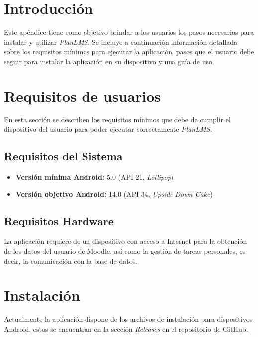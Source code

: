 
\section{Introducción}
Este apéndice tiene como objetivo brindar a los usuarios los pasos necesarios para instalar y utilizar \textit{PlanLMS}. Se incluye a continuación información detallada sobre los requisitos mínimos para ejecutar la aplicación, pasos que el usuario debe seguir para instalar la aplicación en su dispositivo y una guía de uso.

\section{Requisitos de usuarios}
En esta sección se describen los requisitos mínimos que debe de cumplir el dispositivo del usuario para poder ejecutar correctamente \textit{PlanLMS}.

\subsection{Requisitos del Sistema} 
\begin{itemize}
    \item \textbf{Versión mínima Android:} 5.0 (API 21, \textit{Lollipop})
    \item \textbf{Versión objetivo Android:} 14.0 (API 34, \textit{Upside Down Cake})
\end{itemize}

\subsection{Requisitos Hardware}
La aplicación requiere de un dispositivo con acceso a Internet para la obtención de los datos del usuario de Moodle, así como la gestión de tareas personales, es decir, la comunicación con la base de datos.

\section{Instalación}
Actualmente la aplicación dispone de los archivos de instalación para dispositivos Android, estos se encuentran en la sección \textit{Releases} en el repositorio de GitHub.

